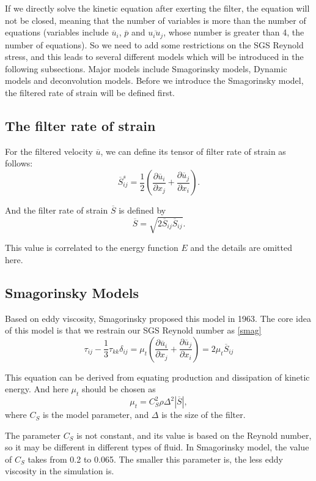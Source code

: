\documentclass[english, nochinese]{pkupaper}
\begin{document}
\par If we directly solve the kinetic equation after exerting the filter, the equation will not be closed, meaning that the number of variables is more than the number of equations (variables include $\overline{u}_i$, $\overline{p}$ and $\overline{u_iu_j}$, whose number is greater than 4, the number of equations). So we need to add some restrictions on the SGS Reynold stress, and this leads to several different models which will be introduced in the following subsections. Major models include Smagorinsky models, Dynamic models and deconvolution models. Before we introduce the Smagorinsky model, the filtered rate of strain will be defined first.

\subsection{The filter rate of strain}
\par For the filtered velocity $\overline{u}$, we can define its tensor of filter rate of strain as follows:
\begin{equation}
	\overline{S}_{ij}^s = \frac{1}{2}\left(\frac{\partial\overline{u}_i}{\partial x_j} + \frac{\partial\overline{u}_j}{\partial x_i}\right).
\end{equation}
\par And the filter rate of strain $\overline{S}$ is defined by
\begin{equation}
	\overline{S} = \sqrt{2\overline{S}_{ij}\overline{S}_{ij}}.
\end{equation}
\par This value is correlated to the energy function $E$ and the details are omitted here.

\subsection{Smagorinsky Models}
\par Based on eddy viscosity, Smagorinsky proposed this model in 1963. The core idea of this model is that we restrain our SGS Reynold number as \eqref{smag}
\begin{equation}\label{smag}
	\tau_{ij} - \frac{1}{3}\tau_{kk}\delta_{ij} = \mu_t\left(\frac{\partial\overline{u}_i}{\partial x_j} + \frac{\partial\overline{u}_j}{\partial x_i}\right) = 2\mu_t\overline{S}_{ij}
\end{equation}
\par This equation can be derived from equating production and dissipation of kinetic energy. And here $\mu_t$ should be chosen as
\begin{equation}\label{mu-t}
	\mu_t = C_S^2\rho\Delta^2|\overline{S}|,
\end{equation}
where $C_S$ is the model parameter, and $\Delta$ is the size of the filter. 
\par The parameter $C_S$ is not constant, and its value is based on the Reynold number, so it may be different in different types of fluid. In Smagorinsky model, the value of $C_S$ takes from 0.2 to 0.065. The smaller this parameter is, the less eddy viscosity in the simulation is.
\end{document}
